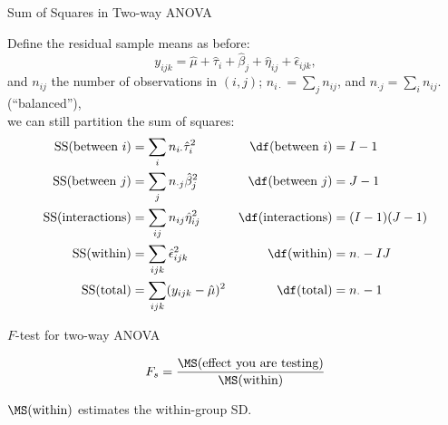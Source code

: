 \begin{frame}{Sum of Squares in Two-way ANOVA}

  Define the residual sample means as before:
    \[
    y_{ijk} = \hat \mu + \hat \tau_i + \hat \beta_j + \hat \eta_{ij} + \hat \epsilon_{ijk} ,
    \]
    and $n_{ij}$ the number of observations in $(i,j)$; 
    $n_{i\cdot} = \sum_j n_{ij}$, and 
    $n_{\cdot j} = \sum_i n_{ij}$.
     (``balanced''),\\
    we can still partition the sum of squares:
  \begin{align*}
    \SS(\text{between $i$}) &= \sum_{i} n_{i\cdot} \hat \tau_{i}^2 & \df(\text{between $i$}) &= I-1 \\
    \SS(\text{between $j$}) &= \sum_{j} n_{\cdot j} \hat \beta_{j}^2 & \df(\text{between $j$}) &= J-1 \\
    \SS(\text{interactions}) &= \sum_{ij} n_{ij} \hat \eta_{ij}^2  & \df(\text{interactions}) &= (I-1)(J-1) \\
    \SS(\text{within}) &= \sum_{ijk} \hat \epsilon_{ijk}^2  & \df(\text{within}) &= n_{\cdot} - IJ\\
    \SS(\text{total}) &= \sum_{ijk} (y_{ijk}-\hat \mu)^2 & \df(\text{total}) &= n_\cdot - 1  
  \end{align*}

\end{frame}

\begin{frame}{$F$-test for two-way ANOVA}

  \[
  F_s = \frac{ \MS(\text{effect you are testing}) }{ \MS(\text{within}) } 
  \]

    \vspace{2em}

     $\MS(\text{within})$ estimates the within-group SD.

\end{frame}

